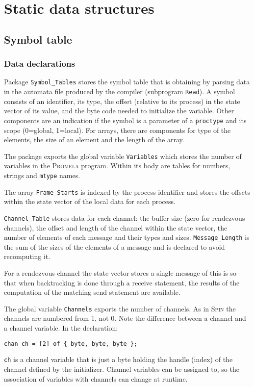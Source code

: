 \documentclass[11pt]{article}
\newcommand*{\spn}{\textsc{Spin}}
\newcommand*{\prm}{\textsc{Promela}}
\newcommand*{\p}[1]{\texttt{#1}}
\begin{document}
\section{Static data structures}

\subsection{Symbol table}

\subsubsection*{Data declarations}

Package \p{Symbol\_Tables} stores the symbol table that is obtaining by
parsing data in the automata file produced by the compiler (subprogram
\p{Read}). A symbol consists of an identifier, its type, the offset
(relative to its process) in the state vector of its value, and the byte
code needed to initialize the variable. Other components are an
indication if the symbol is a parameter of a \p{proctype} and its scope
(0=global, 1=local). For arrays, there are components for type of the
elements, the size of an element and the length of the array.

The package exports the global variable \p{Variables} which stores the
number of variables in the \prm{} program. Within its body are tables
for numbers, strings and \p{mtype} names.

The array \p{Frame\_Starts} is indexed by the process identifier
and stores the offsets within the state vector of the local data for
each process. 

\p{Channel\_Table} stores data for each channel: the buffer size (zero
for rendezvous channels), the offset and length of the channel within
the state vector, the number of elements of each message and their types
and sizes. \p{Message\_Length} is the sum of the sizes of the elements
of a message and is declared to avoid recomputing it.

For a rendezvous channel the state vector stores a single message of
this is so that when backtracking is done through a receive statement,
the results of the computation of the matching send statement are
available.

The global variable \p{Channels} exports the number of channels. As in
\spn{} the channels are numbered from 1, not 0. Note the difference
between a channel and a channel variable. In the declaration:

\begin{footnotesize}
\begin{verbatim}
chan ch = [2] of { byte, byte, byte };
\end{verbatim}
\end{footnotesize}
\p{ch} is a channel variable that is just a byte holding the handle
(index) of the channel defined by the initializer. Channel variables can
be assigned to, so the association of variables with channels can change
at runtime.
\end{document}
